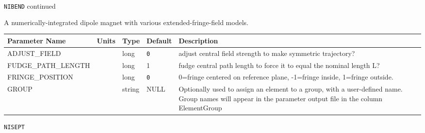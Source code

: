 \newpage
\begin{center}{\Large\verb|NIBEND| continued}\end{center}
A numerically-integrated dipole magnet with various extended-fringe-field models.
\\
\begin{tabular}{|l|l|l|l|p{\descwidth}|} \hline
Parameter Name & Units & Type & Default & Description \\ \hline 
ADJUST\_FIELD &  & long &  \verb|0| & adjust central field strength to make symmetric trajectory?  \\ \hline 
FUDGE\_PATH\_LENGTH &  & long &   1               & fudge central path length to force it to equal the nominal length L?  \\ \hline 
FRINGE\_POSITION &  & long &  \verb|0| & 0=fringe centered on reference plane, -1=fringe inside, 1=fringe outside.  \\ \hline 
GROUP &  & string & NULL & Optionally used to assign an element to a group, with a user-defined name.  Group names will appear in the parameter output file in the column ElementGroup  \\ \hline 
\end{tabular}

\vspace*{0.5in}

\newpage
\begin{center}{\Large\verb|NISEPT|}\end{center}
